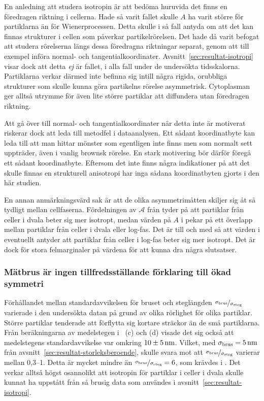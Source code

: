 En anledning att studera isotropin är att bedöma huruvida det finns en föredragen riktning i cellerna. Hade så varit fallet skulle $A$ ha varit större för partiklarna än för Wienerprocessen. Detta skulle i så fall antyda om att det kan finnas strukturer i cellen som påverkar partikelrörelsen. Det hade då varit befogat att studera rörelserna längs dessa föredragna riktningar separat, genom att till exempel införa normal- och tangentialkoordinater. Avsnitt~\ref{sec:resultat-isotropi} visar dock att detta \emph{ej} är fallet, i alla fall under de undersökta tidsskalorna. Partiklarna verkar därmed inte befinna sig intill några rigida, orubbliga strukturer som skulle kunna göra partikelns rörelse asymmetrisk. Cytoplasman ger alltså utrymme för även lite större partiklar att diffundera utan föredragen riktning.

Att gå över till normal- och tangentialkoordinater när detta inte är motiverat riskerar dock att leda till metodfel i dataanalysen. Ett sådant koordinatbyte kan leda till att man hittar mönster som egentligen inte finns men som normalt sett uppträder, även i vanlig brownsk rörelse. En stark motivering bör därför föregå ett sådant koordinatbyte. Eftersom det inte finns några indikationer på att det skulle finnas en strukturell anisotropi har inga sådana koordinatbyten gjorts i den här studien.

En annan anmärkningsvärd sak är att de olika asymmetrimåtten skiljer sig åt så tydligt mellan cellfaserna. Fördelningen av $\mathcal{A}$ från  tyder på att partiklar från celler i dvala beter sig mer isotropt, medan värden på $A$ i  pekar på ett överlapp mellan partiklar från celler i dvala eller log-fas. Det är till och med så att värden i  eventuellt antyder att partiklar från celler i log-fas beter sig mer isotropt. Det är dock för stora felmarginaler på värdena för att kunna dra några slutsatser.


\subsubsection{Mätbrus är ingen tillfredsställande förklaring till ökad symmetri}
Förhållandet mellan standardavvikelsen för bruset och steglängden $\nicefrac{\sigma_\text{brus}}{\sigma_\text{steg}}$ varierade i den undersökta datan på grund av olika rörlighet för olika partiklar. Större partiklar tenderade att förflytta sig kortare sträckor än de små partiklarna. Från beräkningarna av medelstegen i ~(c) och (d) visade det sig också att medel\-stegens standardavvikelse var omkring $\unit[10\pm 5]{nm}$. Vilket, med $\sigma_\text{brus}=\unit[5]{nm}$ från avsnitt~\ref{sec:resultat-storleksberoende}, skulle svara mot att $\nicefrac{\sigma_\text{brus}}{\sigma_\text{steg}}$ varierar mellan 0,3--1. Detta är mycket mindre än $\nicefrac{\sigma_\text{brus}}{\sigma_\text{steg}}=6$, som krävdes i .
Det verkar alltså högst osannolikt att isotropin för partiklar i celler i dvala skulle kunnat ha uppstått från så brusig data som användes i avsnitt~\ref{sec:resultat-isotropi}. 

